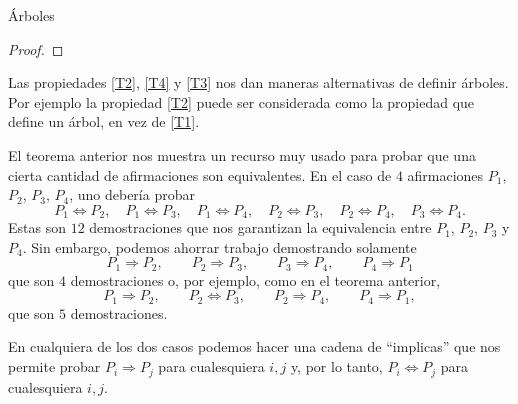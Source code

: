 \begin{section}{Árboles}
\begin{proof}
\end{proof}




Las propiedades \ref{T2}, \ref{T4} y \ref{T3} nos dan maneras alternativas de definir árboles. Por ejemplo la propiedad \ref{T2} puede ser considerada como la propiedad que define un árbol, en vez de  \ref{T1}. 

\begin{comment}
\begin{corolario}
    Si $T=(V,E)$ es un grafo conexo con al menos dos vértices, entonces 
    \begin{enumerate}
        \item[\textbf{(T4)}] \label{T4} El grafo obtenido de $T$ removiendo alguna arista tiene dos componentes, cada una de las cuales es un árbol.
    \end{enumerate}
\end{corolario}
\begin{proof}
    Es parte de la demostración de  \ref{T2} $\Rightarrow$ \ref{T3}: el grafo que se obtiene de quitar una arista,  es un grafo con dos componentes conexas cada una de ellas sin ciclos (pues sino los habría en $T$), luego cada una de ellas es árbol.
\end{proof}
\end{comment}
\begin{observacion*}
El teorema anterior nos muestra un recurso muy usado para probar que una cierta cantidad de afirmaciones son equivalentes. En el caso de $4$ afirmaciones $P_1$, $P_2$, $P_3$, $P_4$, uno debería probar
$$
P_1 \Leftrightarrow P_2,\quad P_1 \Leftrightarrow P_3,\quad P_1 \Leftrightarrow P_4,\quad P_2 \Leftrightarrow P_3,\quad P_2 \Leftrightarrow P_4,\quad P_3 \Leftrightarrow P_4.
$$
Estas son $12$ demostraciones que nos garantizan la equivalencia entre $P_1$, $P_2$, $P_3$ y $P_4$. Sin embargo, podemos ahorrar trabajo demostrando solamente
$$
P_1 \Rightarrow P_2,\qquad P_2 \Rightarrow P_3,\qquad P_3 \Rightarrow P_4, \qquad P_4 \Rightarrow P_1
$$  
que son $4$ demostraciones o, por ejemplo, como en el teorema anterior, 
$$
P_1 \Rightarrow P_2,\qquad P_2 \Leftrightarrow P_3, \qquad P_2 \Rightarrow P_4, \qquad P_4 \Rightarrow P_1, 
$$  
que son $5$  demostraciones.

En  cualquiera de los dos casos podemos hacer una cadena de ``implicas'' que nos permite probar  $P_i \Rightarrow P_j$ para cualesquiera $i,j$ y, por lo tanto, $P_i \Leftrightarrow P_j$ para cualesquiera $i,j$.   
\end{observacion*}


\end{section}
